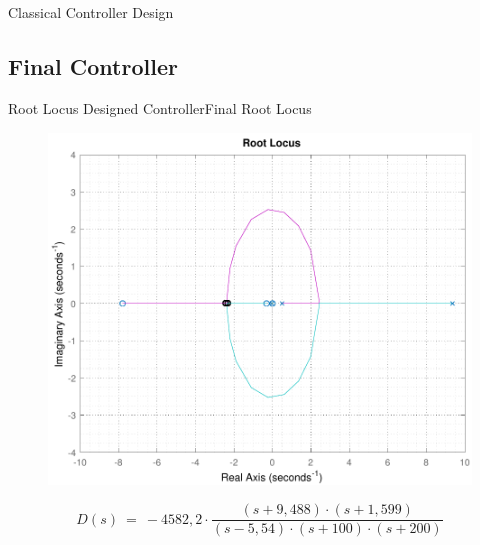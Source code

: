 \subsection{}
\begin{frame}{Classical Controller Design}{}	
	\begin{figure}
		
	\end{figure}
\end{frame}

\subsection{Final Controller}
\begin{frame}{Root Locus Designed Controller}{Final Root Locus}
\begin{figure}
	\includegraphics[scale=.435]{Pictures/RLController}
	\centering
\end{figure}	
%
\pause
%
\begin{displaymath}
	D(s)\ =\ -4582,2 \cdot \frac{(s + 9,488)\cdot (s + 1,599)}{(s - 5,54) \cdot (s + 100) \cdot (s + 200)} \nonumber
\end{displaymath}
\end{frame}

